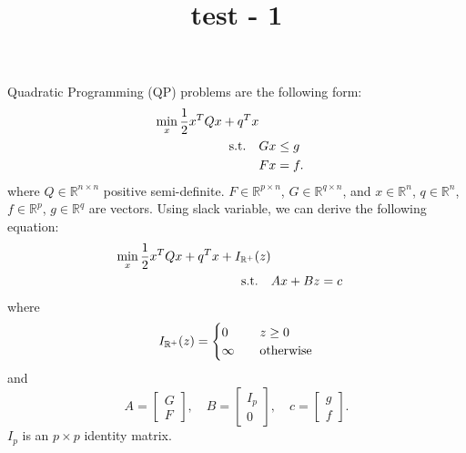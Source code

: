 \documentclass[11pt,reqno]{amsart}
\theoremstyle{definition}
\theoremstyle{remark}
\numberwithin{equation}{section}
\renewcommand{\(}{\left(}
\renewcommand{\)}{\right)}
\newcommand{\R}{\mathbb{R}}
\begin{document}
\title[]
{test - 1}

\maketitle

\section{}

\subsection{}

Quadratic Programming (QP) problems are the following form:
\begin{align}
    \min_x \frac{1}{2} x^T Q x + q^T x \\
    \rm s.t. \quad & Gx \le g \\
    & Fx = f.
\end{align}
where $Q \in \R^{n \times n}$ positive semi-definite. $F \in \R ^{p \times n}$, $G \in \R ^{q \times n}$,
and $x \in \R^n$, $q \in \R^n$, $f \in \R ^p$, $g \in \R ^q$ are vectors.
Using slack variable, we can derive the following equation:
\begin{align}
    \min_x \frac{1}{2} x^T Q x + q^T x + I_{\R^+}(z) \\
    \rm s.t. \quad & Ax + Bz = c
\end{align}
where
\begin{equation}
    I_{\R^+}(z) = \begin{cases}
        0 & \quad z \ge 0 \\
        \infty & \quad \rm otherwise
    \end{cases}
\end{equation}
and
\begin{equation}
    A = \begin{bmatrix}
        G \\ F
    \end{bmatrix},
    \quad
    B = \begin{bmatrix}
        I_p \\ 0
    \end{bmatrix},
    \quad
    c = \begin{bmatrix}
        g \\ f
    \end{bmatrix}.
\end{equation}
$I_p$ is an $p \times p$ identity matrix.
\end{document}
